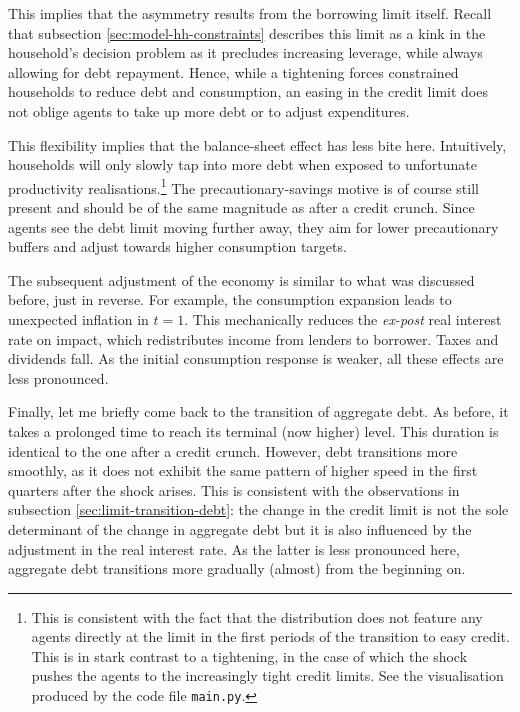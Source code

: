 \documentclass[a4paper,12pt]{article} %
\numberwithin{equation}{section} %
\numberwithin{figure}{section}
\numberwithin{table}{section}
\begin{document}
This implies that the asymmetry results from the borrowing limit itself. Recall that subsection \ref{sec:model-hh-constraints} describes this limit as a kink in the household's decision problem as it precludes increasing leverage, while always allowing for debt repayment. Hence, while a tightening forces constrained households to reduce debt and consumption, an easing in the credit limit does not oblige agents to take up more debt or to adjust expenditures.

This flexibility implies that the balance-sheet effect has less bite here. Intuitively, households will only slowly tap into more debt when exposed to  unfortunate productivity realisations.\footnote{This is consistent with the fact that the distribution does not feature any agents directly at the limit in the first periods of the transition to easy credit. This is in stark contrast to a tightening, in the case of which the shock pushes the agents to the increasingly tight credit limits. See the visualisation produced by the code file \texttt{main.py}.} The precautionary-savings motive is of course still present and should be of the same magnitude as after a credit crunch. Since agents see the debt limit moving further away, they aim for lower precautionary buffers and adjust towards higher consumption targets. 

The subsequent adjustment of the economy is similar to what was discussed before, just in reverse. For example, the consumption expansion leads to unexpected inflation in $t=1$. This mechanically reduces the \textit{ex-post} real interest rate on impact, which redistributes income from lenders to borrower. Taxes and dividends fall. As the initial consumption response is weaker, all these effects are less pronounced. 

Finally, let me briefly come back to the transition of aggregate debt. As before, it takes a prolonged time to reach its terminal (now higher) level. This duration is identical to the one after a credit crunch. However, debt transitions more smoothly, as it does not exhibit the same pattern of higher speed in the first quarters after the shock arises. This is consistent with the observations in subsection \ref{sec:limit-transition-debt}: the change in the credit limit is not the sole determinant of the change in aggregate debt but it is also influenced by the adjustment in the real interest rate. As the latter is less pronounced here, aggregate debt transitions more gradually (almost) from the beginning on.

\end{document}
